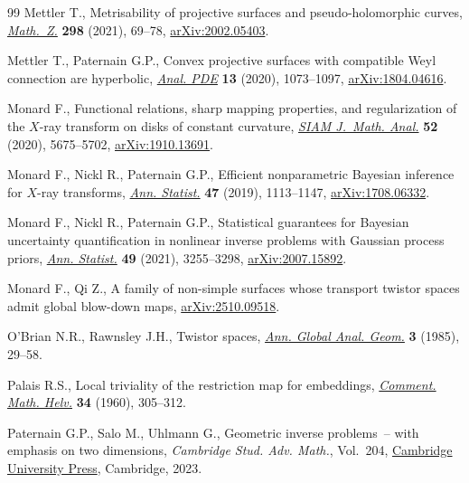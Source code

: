 \documentclass[10pt,a4paper]{amsart}
\numberwithin{equation}{section}
\theoremstyle{definition}
\newcommand{\1}{{\bf 1}}
\begin{document}
\begin{thebibliography}{99}
Mettler T., Metrisability of projective surfaces and pseudo-holomorphic curves,
 \href{https://doi.org/10.1007/s00209-020-02586-6}{\textit{Math.~Z.}}
 \textbf{298} (2021), 69--78,
 \href{http://arxiv.org/abs/2002.05403}{arXiv:2002.05403}.

Mettler T., Paternain G.P., Convex projective surfaces with compatible {W}eyl
 connection are hyperbolic,
 \href{https://doi.org/10.2140/apde.2020.13.1073}{\textit{Anal. PDE}}
 \textbf{13} (2020), 1073--1097,
 \href{http://arxiv.org/abs/1804.04616}{arXiv:1804.04616}.

Monard F., Functional relations, sharp mapping properties, and regularization
 of the {$X$}-ray transform on disks of constant curvature,
 \href{https://doi.org/10.1137/20M1311508}{\textit{SIAM J.~Math. Anal.}}
 \textbf{52} (2020), 5675--5702,
 \href{http://arxiv.org/abs/1910.13691}{arXiv:1910.13691}.

Monard F., Nickl R., Paternain G.P., Efficient nonparametric {B}ayesian
 inference for {$X$}-ray transforms,
 \href{https://doi.org/10.1214/18-AOS1708}{\textit{Ann. Statist.}} \textbf{47}
 (2019), 1113--1147, \href{http://arxiv.org/abs/1708.06332}{arXiv:1708.06332}.

Monard F., Nickl R., Paternain G.P., Statistical guarantees for {B}ayesian
 uncertainty quantification in nonlinear inverse problems with {G}aussian
 process priors, \href{https://doi.org/10.1214/21-aos2082}{\textit{Ann.
 Statist.}} \textbf{49} (2021), 3255--3298,
 \href{http://arxiv.org/abs/2007.15892}{arXiv:2007.15892}.

Monard F., Qi Z., A family of non-simple surfaces whose transport twistor
 spaces admit global blow-down maps,
 \href{http://arxiv.org/abs/2510.09518}{arXiv:2510.09518}.

O'Brian N.R., Rawnsley J.H., Twistor spaces,
 \href{https://doi.org/10.1007/BF00054490}{\textit{Ann. Global Anal. Geom.}}
 \textbf{3} (1985), 29--58.

Palais R.S., Local triviality of the restriction map for embeddings,
 \href{https://doi.org/10.1007/BF02565942}{\textit{Comment. Math. Helv.}}
 \textbf{34} (1960), 305--312.

Paternain G.P., Salo M., Uhlmann G., Geometric inverse problems~-- with
 emphasis on two dimensions, \textit{Cambridge Stud. Adv. Math.}, Vol.~204,
 \href{https://doi.org/10.1017/9781009039901}{Cambridge University Press},
 Cambridge, 2023.


\end{thebibliography}
\end{document}
